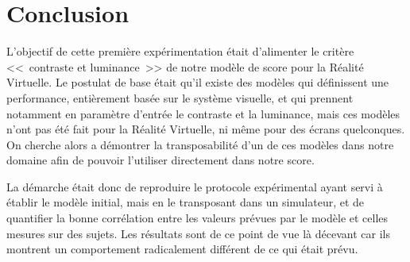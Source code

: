 \chapter*{Conclusion}
\par L'objectif de cette première expérimentation était d'alimenter le critère <<~contraste et luminance~>> de notre modèle de score pour la Réalité Virtuelle. Le postulat de base était qu'il existe des modèles qui définissent une performance, entièrement basée sur le système visuelle, et qui prennent notamment en paramètre d'entrée le contraste et la luminance, mais ces modèles n'ont pas été fait pour la Réalité Virtuelle, ni même pour des écrans quelconques. On cherche alors a démontrer la transposabilité d'un de ces modèles dans notre domaine afin de pouvoir l'utiliser directement dans notre score.

\par La démarche était donc de reproduire le protocole expérimental ayant servi à établir le modèle initial, mais en le transposant  dans un simulateur, et de quantifier la bonne corrélation entre les valeurs prévues par le modèle et celles mesures sur des sujets. Les résultats sont de ce point de vue là décevant car ils montrent un comportement radicalement différent de ce qui était prévu.